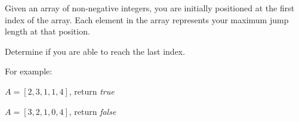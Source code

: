Given an array of non-negative integers, you are initially positioned at the first index of the array. Each element in the array represents your maximum jump length at that position.

Determine if you are able to reach the last index.

For example:

$A=[2,3,1,1,4]$, return {\it true}

$A=[3,2,1,0,4]$, return {\it false}

\bye